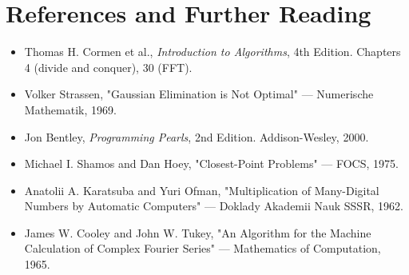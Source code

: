 \section{References and Further Reading}

\begin{itemize}
\item Thomas H. Cormen et al., \textit{Introduction to Algorithms}, 4th Edition. Chapters 4 (divide and conquer), 30 (FFT).
\item Volker Strassen, "Gaussian Elimination is Not Optimal" — Numerische Mathematik, 1969.
\item Jon Bentley, \textit{Programming Pearls}, 2nd Edition. Addison-Wesley, 2000.
\item Michael I. Shamos and Dan Hoey, "Closest-Point Problems" — FOCS, 1975.
\item Anatolii A. Karatsuba and Yuri Ofman, "Multiplication of Many-Digital Numbers by Automatic Computers" — Doklady Akademii Nauk SSSR, 1962.
\item James W. Cooley and John W. Tukey, "An Algorithm for the Machine Calculation of Complex Fourier Series" — Mathematics of Computation, 1965.
\end{itemize}
